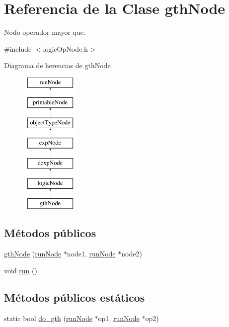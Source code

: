 \hypertarget{classgthNode}{\section{Referencia de la Clase gth\-Node}
\label{classgthNode}
}


Nodo operador mayor que.  




{\ttfamily \#include $<$logic\-Op\-Node.\-h$>$}

Diagrama de herencias de gth\-Node\begin{figure}[H]
\begin{center}
\leavevmode
\includegraphics[height=7.000000cm]{classgthNode}
\end{center}
\end{figure}
\subsection*{Métodos públicos}
\begin{DoxyCompactItemize}
\item 
\hyperlink{classgthNode_a394e036e7396a7f18d19321fbc878995}{gth\-Node} (\hyperlink{classrunNode}{run\-Node} $\ast$node1, \hyperlink{classrunNode}{run\-Node} $\ast$node2)
\item 
void \hyperlink{classgthNode_ae514f348e41cc8ef252f4c4d83771fef}{run} ()
\end{DoxyCompactItemize}
\subsection*{Métodos públicos estáticos}
\begin{DoxyCompactItemize}
\item 
static bool \hyperlink{classgthNode_ad4dd988a759af6ebf96d3a8def63b502}{do\-\_\-gth} (\hyperlink{classrunNode}{run\-Node} $\ast$op1, \hyperlink{classrunNode}{run\-Node} $\ast$op2)
\end{DoxyCompactItemize}
